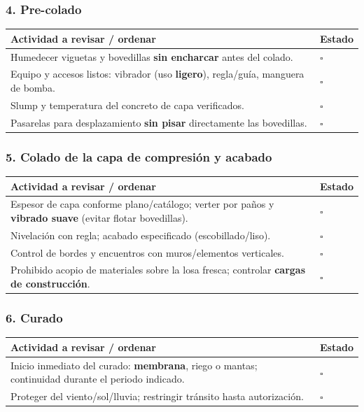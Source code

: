 \documentclass[12pt]{article}
\newcommand{\cbox}{\(\square\)} %
\begin{document}
 \subsubsection*{4. Pre-colado}
 \begin{tabularx}{\linewidth}{>{\raggedright\arraybackslash}p{0.93\linewidth} >{\centering\arraybackslash}m{0.07\linewidth}}
 	\toprule
 	\textbf{Actividad a revisar / ordenar} & \textbf{Estado}\\
 	\midrule
 	Humedecer viguetas y bovedillas \textbf{sin encharcar} antes del colado. & \cbox \\
 	Equipo y accesos listos: vibrador (uso \textbf{ligero}), regla/guía, manguera de bomba. & \cbox \\
 	Slump y temperatura del concreto de capa verificados. & \cbox \\
 	Pasarelas para desplazamiento \textbf{sin pisar} directamente las bovedillas. & \cbox \\
 	\bottomrule
 \end{tabularx}
 
 \subsubsection*{5. Colado de la capa de compresión y acabado}
 \begin{tabularx}{\linewidth}{>{\raggedright\arraybackslash}p{0.93\linewidth} >{\centering\arraybackslash}m{0.07\linewidth}}
 	\toprule
 	\textbf{Actividad a revisar / ordenar} & \textbf{Estado}\\
 	\midrule
 	Espesor de capa conforme plano/catálogo; verter por paños y \textbf{vibrado suave} (evitar flotar bovedillas). & \cbox \\
 	Nivelación con regla; acabado especificado (escobillado/liso). & \cbox \\
 	Control de bordes y encuentros con muros/elementos verticales. & \cbox \\
 	Prohibido acopio de materiales sobre la losa fresca; controlar \textbf{cargas de construcción}. & \cbox \\
 	\bottomrule
 \end{tabularx}
 
 \subsubsection*{6. Curado}
 \begin{tabularx}{\linewidth}{>{\raggedright\arraybackslash}p{0.93\linewidth} >{\centering\arraybackslash}m{0.07\linewidth}}
 	\toprule
 	\textbf{Actividad a revisar / ordenar} & \textbf{Estado}\\
 	\midrule
 	Inicio inmediato del curado: \textbf{membrana}, riego o mantas; continuidad durante el periodo indicado. & \cbox \\
 	Proteger del viento/sol/lluvia; restringir tránsito hasta autorización. & \cbox \\
 	\bottomrule
 \end{tabularx}
 
\end{document}
